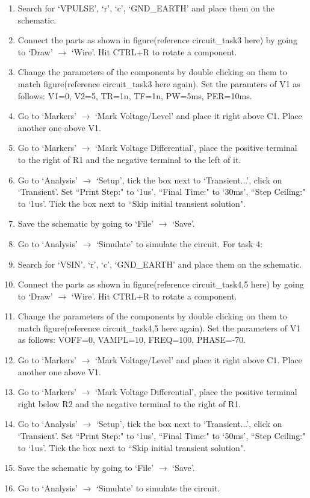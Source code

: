 \documentclass[12pt,a4paper]{article}
\begin{document}
\begin{enumerate}
		\item Search for `VPULSE', `r', `c', `GND\_EARTH' and place them on the schematic.
		\item Connect the parts as shown in figure(reference circuit\_task3 here) by going to `Draw' $\rightarrow$ `Wire'. Hit CTRL+R to rotate a component.
		\item Change the parameters of the components by double clicking on them to match figure(reference circuit\_task3 here again). Set the paramters of V1 as follows:
		V1=0, V2=5, TR=1n, TF=1n, PW=5ms, PER=10ms.
		\item Go to `Markers' $\rightarrow$ `Mark Voltage/Level' and place it right above C1. Place another one above V1.
		\item Go to `Markers' $\rightarrow$ `Mark Voltage Differential', place the positive terminal to the right of R1 and the negative terminal to the left of it.
		\item Go to `Analysis' $\rightarrow$ `Setup', tick the box next to `Transient...', click on `Transient'. Set ``Print Step:" to `1us', ``Final Time:" to `30ms', ``Step Ceiling:" to `1us'. Tick the box next to ``Skip initial transient solution".
		\item Save the schematic by going to `File' $\rightarrow$ `Save'.
		\item Go to `Analysis' $\rightarrow$ `Simulate' to simulate the circuit.
		\newline
		For task 4:
		
		\item Search for `VSIN', `r', `c', `GND\_EARTH' and place them on the schematic.
		\item Connect the parts as shown in figure(reference circuit\_task4,5 here) by going to `Draw' $\rightarrow$ `Wire'. Hit CTRL+R to rotate a component.
		\item Change the parameters of the components by double clicking on them to match figure(reference circuit\_task4,5 here again). Set the parameters of V1 as follows: VOFF=0, VAMPL=10, FREQ=100, PHASE=-70.
		\item Go to `Markers' $\rightarrow$ `Mark Voltage/Level' and place it right above C1. Place another one above V1.
		\item Go to `Markers' $\rightarrow$ `Mark Voltage Differential', place the positive terminal right below R2 and the negative terminal to the right of R1.
		\item Go to `Analysis' $\rightarrow$ `Setup', tick the box next to `Transient...', click on `Transient'. Set ``Print Step:" to `1us', ``Final Time:" to `50ms', ``Step Ceiling:" to `1us'. Tick the box next to ``Skip initial transient solution".
		\item Save the schematic by going to `File' $\rightarrow$ `Save'.
		\item Go to `Analysis' $\rightarrow$ `Simulate' to simulate the circuit.
		

\end{enumerate}
\end{document}
